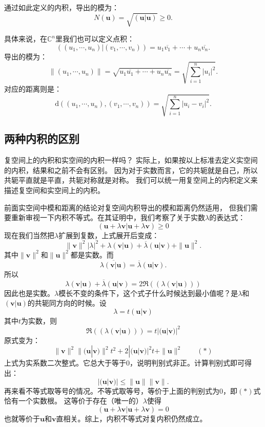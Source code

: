 \documentclass[12pt,UTF8,fontset=none]{ctexbook}
\begin{document}
通过如此定义的内积，导出的模为：
$$ N(\mathbf{u}) = \sqrt{(\mathbf{u}|\mathbf{u})} \geqslant 0.$$

具体来说，在$\mathbb{C}^n$里我们也可以定义点积：
$$ \left((u_1, \cdots, u_n)|(v_1, \cdots, v_n)\right) = u_1\overline{v_1} + \cdots + u_n\overline{v_n}.$$
导出的模为：
$$ \| (u_1, \cdots, u_n)\| = \sqrt{u_1\overline{u_1} + \cdots + u_n\overline{u_n}} = \sqrt{\sum_{i=1}^n |u_i|^2}. $$
对应的距离则是：
$$ \mathrm{d} \left((u_1, \cdots, u_n), (v_1, \cdots, v_n)\right)= \sqrt{\sum_{i=1}^n |u_i - v_i|^2}. $$

\subsection{两种内积的区别}
复空间上的内积和实空间的内积一样吗？
实际上，如果按以上标准去定义实空间的内积，结果和之前不会有区别。
因为对于实数而言，它的共轭就是自己，所以共轭平直就是平直，共轭对称就是对称。
我们可以统一用复空间上的内积定义来描述复空间和实空间上的内积。

前面实空间中模和距离的结论对复空间内积导出的模和距离仍然适用，
但我们需要重新审视一下内积不等式。在其证明中，我们考察了关于实数$\lambda$的表达式：
$$ (\mathbf{u}+ \lambda\mathbf{v} |\mathbf{u}+ \lambda\mathbf{v} ) \geqslant 0 $$
现在我们当然把$\lambda$扩展到复数，上式展开后变成：
$$ \|\mathbf{v} \|^2 |\lambda|^2 + \lambda(\mathbf{v} | \mathbf{u}) + \overline{\lambda}(\mathbf{u} | \mathbf{v}) + \|\mathbf{u} \|^2.$$
其中$\|\mathbf{v} \|^2$和$\|\mathbf{u} \|^2$都是实数。而
$$ \overline{\lambda(\mathbf{v} | \mathbf{u})} = \overline{\lambda}(\mathbf{u} | \mathbf{v}).$$
所以
$$\lambda(\mathbf{v} | \mathbf{u}) + \overline{\lambda}(\mathbf{u} | \mathbf{v}) = 2\Re(\left(\lambda(\mathbf{v} | \mathbf{u})\right)) $$
因此也是实数。$\lambda$模长不变的条件下，这个式子什么时候达到最小值呢？是$\lambda$和$(\mathbf{v} | \mathbf{u})$的共轭同方向的时候。设
$$ \lambda = t (\mathbf{u} | \mathbf{v})$$
其中$t$为实数，则
$$ \Re(\left(\lambda(\mathbf{v} | \mathbf{u})\right)) = t| (\mathbf{u} | \mathbf{v})|^2$$
原式变为：
$$ \|\mathbf{v} \|^2 \| (\mathbf{u} | \mathbf{v})\|^2 t^2 + 2| (\mathbf{u} | \mathbf{v})|^2 t + \|\mathbf{u} \|^2 \quad \quad (*)$$
上式为实系数二次整式。它总大于等于0，说明判别式非正。计算判别式即可得出：
$$ | (\mathbf{u} | \mathbf{v})| \leqslant \|\mathbf{u} \| \|\mathbf{v} \|.$$
再来看不等式取等号的情况。不等式取等号，等价于上面的判别式为0，即$(*)$式恰有一个实数根。
这等价于存在（唯一的）$\lambda$使得
$$ (\mathbf{u}+ \lambda\mathbf{v} |\mathbf{u}+ \lambda\mathbf{v} ) = 0 $$
也就等价于$\mathbf{u}$和$\mathbf{v}$直相关。综上，内积不等式对复内积仍然成立。
\end{document}
